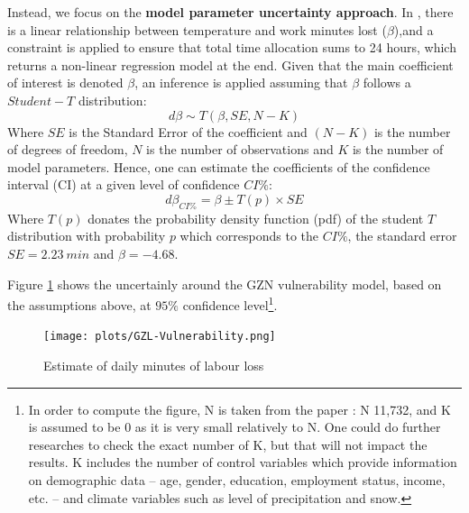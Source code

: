 \documentclass[a4paper,11pt]{extarticle} %
\begin{document}
Instead, we focus on the \textbf{model parameter uncertainty approach}. In \cite{ZhangAndShindell:2021}, there is a linear relationship between temperature and work minutes lost ($\beta$),and a constraint is applied to ensure that total time allocation sums to 24 hours, which returns a non-linear regression model at the end. Given that the main coefficient of interest is denoted $\beta$, an inference is applied assuming that $\beta$ follows a $Student-T$ distribution: 
\begin{equation}
 \label{Eq:uncertaintyStudentT}   
 d\beta \sim T(\beta, SE, N-K)
\end{equation}
Where $SE$ is the Standard Error of the coefficient and $(N-K)$ is the number of degrees of freedom, $N$ is the number of observations and $K$ is the number of model parameters. Hence, one can estimate the coefficients of the confidence interval (CI) at a given level of confidence $CI\%$: 
\begin{equation}
 \label{Eq:CIStudent}   
 d\beta_{CI\%} = \beta \pm T(p) \times SE
\end{equation}
Where $T(p)$ donates the probability density function (pdf) of the student $T$ distribution with probability $p$ which corresponds to the $CI\%$, the standard error $SE = 2.23 \ min$ and $\beta =  - 4.68$.


Figure \ref{fig:GZL-Vulnerability} shows the uncertainly around the GZN vulnerability model, based on the assumptions above, at $95\%$ confidence level\footnote{In order to compute the figure, N is taken from the paper \cite{TemperatureAndWork:2021}: N 11,732, and K is assumed to be 0 as it is very small relatively to N. One could do further researches to check the exact number of K, but that will not impact the results. K includes the number of control variables which provide information on demographic data -- age, gender, education, employment status, income, etc. -- and climate variables such as level of precipitation and snow.}.
\begin{figure}[h]
    \centering
    \texttt{[image: plots/GZL-Vulnerability.png]}
    \caption{Estimate of daily minutes of labour loss}
    \label{fig:GZL-Vulnerability}
\end{figure}
\end{document}
